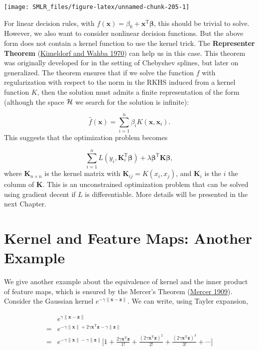 \documentclass[
]{book}
\theoremstyle{definition}
\theoremstyle{definition}
\theoremstyle{definition}
\theoremstyle{definition}
\theoremstyle{remark}
\begin{document}
\begin{center}\texttt{[image: SMLR\_files/figure-latex/unnamed-chunk-205-1]} \end{center}

For linear decision rules, with \(f(\mathbf{x}) = \beta_0 + \mathbf{x}^\text{T}\boldsymbol \beta\), this should be trivial to solve. However, we also want to consider nonlinear decision functions. But the above form does not contain a kernel function to use the kernel trick. The \textbf{Representer Theorem} (\protect\hyperlink{ref-kimeldorf1970correspondence}{Kimeldorf and Wahba 1970}) can help us in this case. This theorem was originally developed for in the setting of Chebyshev splines, but later on generalized. The theorem ensures that if we solve the function \(f\) with regularization with respect to the norm in the RKHS induced from a kernel function \(K\), then the solution must admits a finite representation of the form (although the space \({\cal H}\) we search for the solution is infinite):

\[\widehat{f}(\mathbf{x}) = \sum_{i = 1}^n \beta_i K(\mathbf{x}, \mathbf{x}_i).\]
This suggests that the optimization problem becomes

\[\sum_{i=1}^n L(y_i, \mathbf{K}_i^\text{T}\boldsymbol \beta) + \lambda \boldsymbol \beta^\text{T}\mathbf{K}\boldsymbol \beta,\]
where \(\mathbf{K}_{n \times n}\) is the kernel matrix with \(\mathbf{K}_{ij} = K(x_i, x_j)\), and \(\mathbf{K}_i\) is the \(i\) the column of \(\mathbf{K}\). This is an unconstrained optimization problem that can be solved using gradient decent if \(L\) is differentiable. More details will be presented in the next Chapter.

\hypertarget{kernel-and-feature-maps-another-example}{%
\section{Kernel and Feature Maps: Another Example}\label{kernel-and-feature-maps-another-example}}

We give another example about the equivalence of kernel and the inner product of feature maps, which is ensured by the Mercer's Theorem (\protect\hyperlink{ref-mercer1909xvi}{Mercer 1909}). Consider the Gaussian kernel \(e^{-\gamma \lVert \mathbf{x}- \mathbf{z}\rVert}\). We can write, using Tayler expansion,

\begin{align}
&e^{\gamma \lVert \mathbf{x}- \mathbf{z}\rVert} \nonumber \\
=& e^{-\gamma \lVert \mathbf{x}\rVert + 2 \gamma \mathbf{x}^\text{T}\mathbf{z}- \gamma \lVert \mathbf{z}\rVert} \nonumber \\
=& e^{-\gamma \lVert \mathbf{x}\rVert - \gamma \lVert \mathbf{z}\rVert} \bigg[ 1 + \frac{2 \gamma \mathbf{x}^\text{T}\mathbf{z}}{1!} + \frac{(2 \gamma \mathbf{x}^\text{T}\mathbf{z})^2}{2!} + \frac{(2 \gamma \mathbf{x}^\text{T}\mathbf{z})^3}{3!} + \cdots \bigg]
\end{align}
\end{document}
